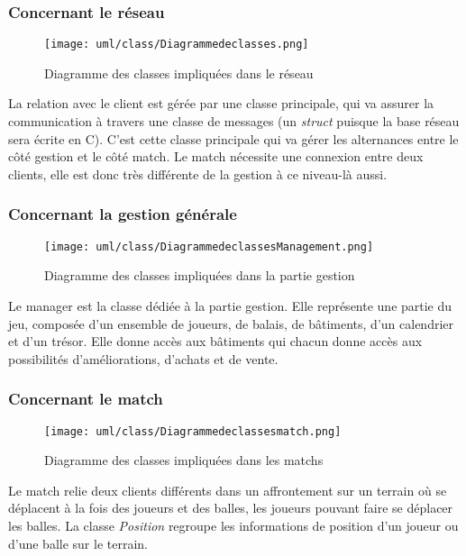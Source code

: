 \documentclass[a4paper,titlepage]{scrreprt}
\begin{document}
  \subsubsection{Concernant le réseau}
    \begin{figure}[H]
    \center
    \texttt{[image: uml/class/Diagrammedeclasses.png]}
    \caption{Diagramme des classes impliquées dans le réseau}
    \end{figure}	
    La relation avec le client est gérée par une classe principale, qui va assurer la communication
    à travers une classe de messages (un \emph{struct} puisque la base réseau sera écrite en C).
    C'est cette classe principale qui va gérer les alternances entre le côté gestion et le côté match. Le match nécessite une connexion entre deux clients, elle est donc très différente de la gestion
    à ce niveau-là aussi.
  \subsubsection{Concernant la gestion générale}
    \begin{figure}[H]
    \center
    \texttt{[image: uml/class/DiagrammedeclassesManagement.png]}
    \caption{Diagramme des classes impliquées dans la partie gestion}
    \end{figure}	
    Le manager est la classe dédiée à la partie gestion. Elle représente une partie du jeu,
    composée d'un ensemble de joueurs, de balais, de bâtiments, d'un calendrier et d'un trésor.
    Elle donne accès aux bâtiments qui chacun donne accès aux possibilités d'améliorations, d'achats et de vente.
  \subsubsection{Concernant le match}
    \begin{figure}[H]
    \center
    \texttt{[image: uml/class/Diagrammedeclassesmatch.png]}
    \caption{Diagramme des classes impliquées dans les matchs}
    \end{figure}	
    Le match relie deux clients différents dans un affrontement sur un \gls{terrain} 
    où se déplacent à la fois des joueurs et des balles, les joueurs pouvant faire se déplacer les balles. La classe \emph{Position} regroupe les informations de position d'un joueur ou d'une balle sur le terrain.
\end{document}
